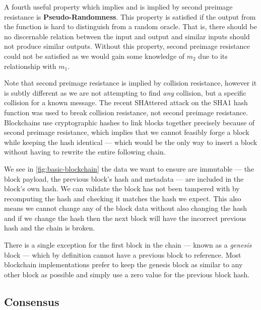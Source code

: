 A fourth useful property which implies and is implied by second preimage resistance is \textbf{Pseudo-Randomness}. This property is satisfied if the output from the function is hard to distinguish from a random oracle. That is, there should be no discernable relation between the input and output and similar inputs should not produce similar outputs. Without this property, second preimage resistance could not be satisfied as we would gain some knowledge of $m_2$ due to its relationship with $m_1$.

Note that second preimage resistance is implied by collision resistance, however it is subtly different as we are not attempting to find \emph{any} collision, but a specific collision for a known message. The recent SHAttered \cite{stevensFirstCollisionFull2017} attack on the SHA1 hash function was used to break collision resistance, not second preimage resistance. Blockchains use cryptographic hashes to link blocks together precisely because of second preimage resistance, which implies that we cannot feasibly forge a block while keeping the hash identical --- which would be the only way to insert a block without having to rewrite the entire following chain.

We see in \autoref{fig:basic-blockchain} the data we want to ensure are immutable --- the block payload, the previous block's hash and metadata --- are included in the block's own hash.  We can validate the block has not been tampered with by recomputing the hash and checking it matches the hash we expect. This also means we cannot change any of the block data without also changing the hash and if we change the hash then the next block will have the incorrect previous hash and the chain is broken.

There is a single exception for the first block in the chain --- known as a \emph{genesis} block --- which by definition cannot have a previous block to reference. Most blockchain implementations prefer to keep the genesis block as similar to any other block as possible and simply use a zero value for the previous block hash.



\subsection{Consensus}
\label{ch:blockchain:structure:consensus}

